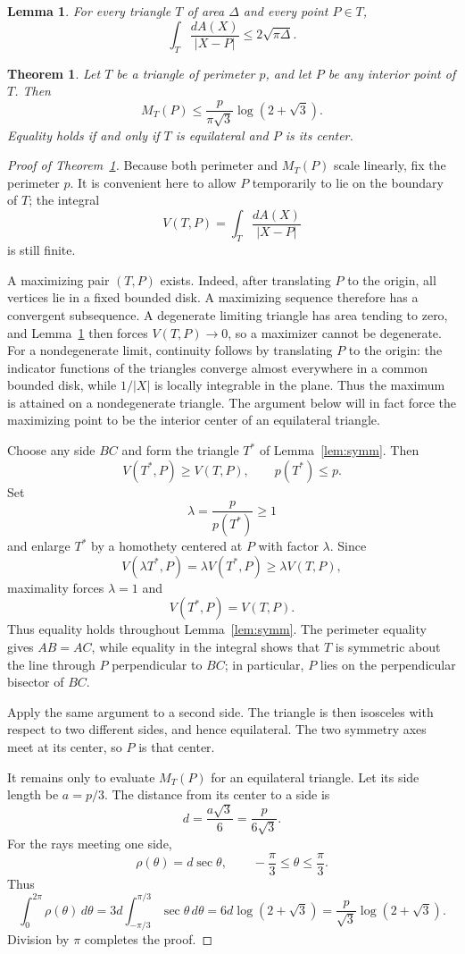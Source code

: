 \documentclass[10pt,a4paper]{amsart}
\newtheorem{theorem}{Theorem}
\newtheorem{lemma}{Lemma}
\newcommand{\area}{\Delta}
\begin{document}
\begin{lemma}\label{lem:area-bound}
For every triangle $T$ of area $\area$ and every point $P\in T$,
\[
 \int_T\frac{dA(X)}{|X-P|}
 \le 2\sqrt{\pi\area}.
\]
\end{lemma}

\begin{theorem}\label{thm:main}
Let $T$ be a triangle of perimeter $p$, and let $P$ be any interior
point of $T$.  Then
\[
 {
 M_T(P)\le
 \frac{p}{\pi\sqrt3}\log(2+\sqrt3).
 }
\]
Equality holds if and only if $T$ is equilateral and $P$ is its
center.
\end{theorem}

\begin{proof}[Proof of Theorem~\ref{thm:main}]
Because both perimeter and $M_T(P)$ scale linearly, fix the perimeter
$p$.  It is convenient here to allow $P$ temporarily to lie on the
boundary of $T$; the integral
\[
 V(T,P)=\int_T\frac{dA(X)}{|X-P|}
\]
is still finite.

A maximizing pair $(T,P)$ exists.  Indeed, after translating $P$ to
the origin, all vertices lie in a fixed bounded disk.  A maximizing
sequence therefore has a convergent subsequence.  A degenerate
limiting triangle has area tending to zero, and
Lemma~\ref{lem:area-bound} then forces $V(T,P)\to0$, so a maximizer
cannot be degenerate.  For a nondegenerate limit, continuity follows
by translating $P$ to the origin: the indicator functions of the
triangles converge almost everywhere in a common bounded disk, while
$1/|X|$ is locally integrable in the plane.  Thus the maximum is
attained on a nondegenerate triangle.  The argument below will in
fact force the maximizing point to be the interior center of an
equilateral triangle.

Choose any side $BC$ and form the triangle $T^*$ of
Lemma~\ref{lem:symm}.  Then
\[
 V(T^*,P)\ge V(T,P),
 \qquad
 p(T^*)\le p.
\]
Set
\[
 \lambda=\frac{p}{p(T^*)}\ge1
\]
and enlarge $T^*$ by a homothety centered at $P$ with factor
$\lambda$.  Since
\[
 V(\lambda T^*,P)=\lambda V(T^*,P)
 \ge \lambda V(T,P),
\]
maximality forces $\lambda=1$ and
\[
 V(T^*,P)=V(T,P).
\]
Thus equality holds throughout Lemma~\ref{lem:symm}.  The perimeter
equality gives $AB=AC$, while equality in the integral shows that
$T$ is symmetric about the line through $P$ perpendicular to $BC$;
in particular, $P$ lies on the perpendicular bisector of $BC$.

Apply the same argument to a second side.  The triangle is then
isosceles with respect to two different sides, and hence equilateral.
The two symmetry axes meet at its center, so $P$ is that center.

It remains only to evaluate $M_T(P)$ for an equilateral triangle.
Let its side length be $a=p/3$.  The distance from its center to a
side is
\[
 d=\frac{a\sqrt3}{6}=\frac{p}{6\sqrt3}.
\]
For the rays meeting one side,
\[
 \rho(\theta)=d\sec\theta,
 \qquad -\frac{\pi}{3}\le\theta\le\frac{\pi}{3}.
\]
Thus
\[
 \int_0^{2\pi}\rho(\theta)\,d\theta
 =
 3d\int_{-\pi/3}^{\pi/3}\sec\theta\,d\theta
 =
 6d\log(2+\sqrt3)
 =
 \frac{p}{\sqrt3}\log(2+\sqrt3).
\]
Division by $\pi$ completes the proof.
\end{proof}
\end{document}
